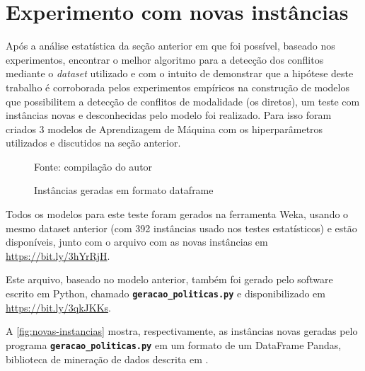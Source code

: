 \section{Experimento com novas instâncias}\label{exp:novas-instancias}
Após a análise estatística da seção anterior em que foi possível, baseado nos experimentos, encontrar o melhor algoritmo para a detecção dos conflitos mediante o \textit{dataset} utilizado e com o intuito de demonstrar que a hipótese deste trabalho é corroborada pelos experimentos empíricos na construção de modelos que possibilitem a detecção de conflitos de modalidade (os diretos), um teste com instâncias novas e desconhecidas pelo modelo foi realizado. Para isso foram criados 3 modelos de Aprendizagem de Máquina com os hiperparâmetros utilizados e discutidos na seção anterior. 

\begin{figure}[H]
	\centering
	\caption{Instâncias geradas em formato dataframe}
	
	\label{fig:novas-instancias}
	{\scriptsize Fonte: compilação do autor}
\end{figure}

Todos os modelos para este teste foram gerados na ferramenta Weka, usando o mesmo dataset anterior (com 392 instâncias usado nos testes estatísticos) e estão disponíveis, junto com o arquivo com as novas instâncias em \url{https://bit.ly/3hYrRjH}. 

Este arquivo, baseado no modelo anterior, também foi gerado pelo software  escrito em Python, chamado \texttt{\textbf{geracao\_politicas.py}}  e disponibilizado em \url{https://bit.ly/3qkJKKs}. 

A \autoref{fig:novas-instancias} mostra, respectivamente, as instâncias novas geradas pelo programa \texttt{\textbf{geracao\_politicas.py}} em um formato de um DataFrame Pandas, biblioteca de mineração de dados descrita em . 

